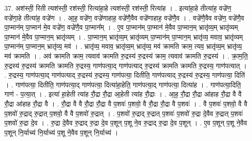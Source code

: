 \documentclass[17pt]{extarticle}
\begin{document}
37. अश॑स्ती॒ रिती त्यश॑स्ती॒ रश॑स्ती॒ रित्या॑हा॒हे त्यश॑स्ती॒ रश॑स्ती॒ रित्या॑ह । . इत्या॑हा॒हे तीत्या॑ह॒ वज्रे॑ण॒ वज्रे॑णा॒हे तीत्या॑ह॒ वज्रे॑ण । . आ॒ह॒ वज्रे॑ण॒ वज्रे॑णाहाह॒ वज्रे॑णै॒वैव वज्रे॑णाहाह॒ वज्रे॑णै॒व । . वज्रे॑णै॒वैव वज्रे॑ण॒ वज्रे॑णै॒व पा॒प्मान॑म् पा॒प्मान॑ मे॒व वज्रे॑ण॒ वज्रे॑णै॒व पा॒प्मान᳚म् । . ए॒व पा॒प्मान॑म् पा॒प्मान॑ मे॒वैव पा॒प्मान॒म् भ्रातृ॑व्य॒म् भ्रातृ॑व्यम् पा॒प्मान॑ मे॒वैव पा॒प्मान॒म् भ्रातृ॑व्यम् । . पा॒प्मान॒म् भ्रातृ॑व्य॒म् भ्रातृ॑व्यम् पा॒प्मान॑म् पा॒प्मान॒म् भ्रातृ॑व्य॒ मवाव॒ भ्रातृ॑व्यम् पा॒प्मान॑म् पा॒प्मान॒म् भ्रातृ॑व्य॒ मव॑ । . भ्रातृ॑व्य॒ मवाव॒ भ्रातृ॑व्य॒म् भ्रातृ॑व्य॒ मव॑ क्रामति क्राम॒ त्यव॒ भ्रातृ॑व्य॒म् भ्रातृ॑व्य॒ मव॑ क्रामति । . अव॑ क्रामति क्राम॒ त्यवाव॑ क्रामति रु॒द्रस्य॑ रु॒द्रस्य॑ क्राम॒ त्यवाव॑ क्रामति रु॒द्रस्य॑ । . क्रा॒म॒ति॒ रु॒द्रस्य॑ रु॒द्रस्य॑ क्रामति क्रामति रु॒द्रस्य॒ गाण॑पत्या॒द् गाण॑पत्याद् रु॒द्रस्य॑ क्रामति क्रामति रु॒द्रस्य॒ गाण॑पत्यात् । . रु॒द्रस्य॒ गाण॑पत्या॒द् गाण॑पत्याद् रु॒द्रस्य॑ रु॒द्रस्य॒ गाण॑पत्या॒ दितीति॒ गाण॑पत्याद् रु॒द्रस्य॑ रु॒द्रस्य॒ गाण॑पत्या॒ दिति॑ । . गाण॑पत्या॒ दितीति॒ गाण॑पत्या॒द् गाण॑पत्या॒ दित्या॑हा॒हेति॒ गाण॑पत्या॒द् गाण॑पत्या॒ दित्या॑ह । . गाण॑पत्या॒दिति॒ गाण॑ - प॒त्या॒त् । . इत्या॑ हा॒हेती त्या॑ह रौ॒द्रा रौ॒द्रा आ॒हेती त्या॑ह रौ॒द्राः । . आ॒ह॒ रौ॒द्रा रौ॒द्रा आ॑हाह रौ॒द्रा वै वै रौ॒द्रा आ॑हाह रौ॒द्रा वै । . रौ॒द्रा वै वै रौ॒द्रा रौ॒द्रा वै प॒शवः॑ प॒शवो॒ वै रौ॒द्रा रौ॒द्रा वै प॒शवः॑ । . वै प॒शवः॑ प॒शवो॒ वै वै प॒शवो॑ रु॒द्राद् रु॒द्रात् प॒शवो॒ वै वै प॒शवो॑ रु॒द्रात् । . प॒शवो॑ रु॒द्राद् रु॒द्रात् प॒शवः॑ प॒शवो॑ रु॒द्रा दे॒वैव रु॒द्रात् प॒शवः॑ प॒शवो॑ रु॒द्रा दे॒व । . रु॒द्रा दे॒वैव रु॒द्राद् रु॒द्रा दे॒व प॒शून् प॒शू ने॒व रु॒द्राद् रु॒द्रा दे॒व प॒शून् । . ए॒व प॒शून् प॒शू ने॒वैव प॒शून् नि॒र्याच्य॑ नि॒र्याच्य॑ प॒शू ने॒वैव प॒शून् नि॒र्याच्य॑ । \newline
\pagebreak
{}
\end{document}
